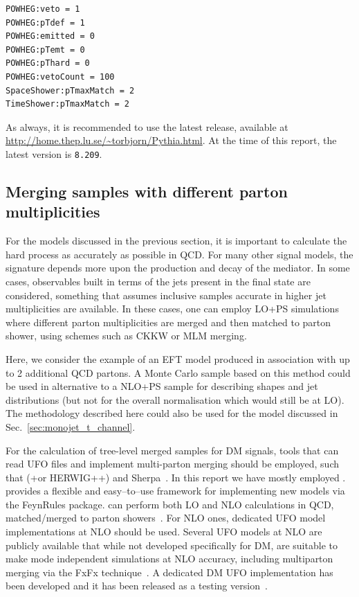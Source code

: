 \begin{verbatim}
POWHEG:veto = 1
POWHEG:pTdef = 1
POWHEG:emitted = 0
POWHEG:pTemt = 0
POWHEG:pThard = 0
POWHEG:vetoCount = 100
SpaceShower:pTmaxMatch = 2
TimeShower:pTmaxMatch = 2
\end{verbatim}
As always, it is recommended to use the latest \pythiaEight release,
available at \url{http://home.thep.lu.se/~torbjorn/Pythia.html}.
At the time of this report, the latest version is \texttt{8.209}.

\subsection{Merging samples with different parton multiplicities}
\label{sec:monojet_parton_match}

For the models discussed in the previous section, it is important
to calculate the hard process as accurately as possible in QCD.
For many other signal models, the \MET{} signature depends more
upon the production and decay of the mediator. In some cases, observables
built in terms of the jets present in the final state are considered, something that assumes inclusive samples accurate in higher jet multiplicities are available.  In these cases, one can employ LO+PS simulations where different parton multiplicities are merged and then matched to parton shower, using schemes such as CKKW or MLM merging.

Here, we consider the example of an EFT model produced in association
with up to 2 additional QCD partons.   A Monte Carlo sample based on
this method could be used in alternative to a NLO+PS sample for describing shapes 
and jet distributions (but not for the overall normalisation which would still be at LO).
The methodology described here could also be used for the \tchannel model
discussed in Sec.~\ref{sec:monojet_t_channel}.

For the calculation of tree-level merged samples for DM signals, tools that can  
read UFO files and implement multi-parton merging should be employed, such 
that \madgraph (+\pythiaEight or {\sc HERWIG++}) and {\sc Sherpa}~\cite{Hoche:2014kca}.
In this report we have mostly employed \madgraph. 
\madgraph provides a flexible and easy--to--use framework for implementing
new models via the {\sc FeynRules} package.
\madgraph can perform both LO and NLO calculations in QCD, matched/merged to parton showers~\cite{Alwall:2008qv}. For NLO ones, dedicated UFO model implementations at NLO should be used. Several UFO models at NLO are publicly available that while not developed specifically for DM, are suitable to make mode independent simulations at NLO accuracy, including multiparton merging 
via the FxFx technique~\cite{Frederix:2012ps}. A dedicated DM UFO implementation 
has been developed and it has been released as a testing version~\cite{NewMadgraphModels}.

